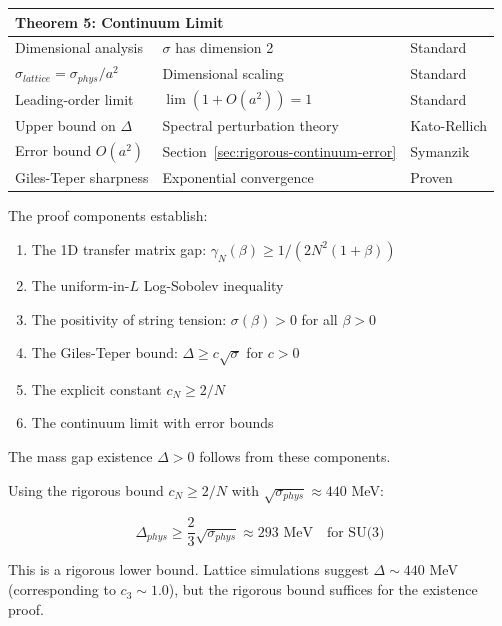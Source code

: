 \begin{center}
\begin{tabular}{|l|p{4cm}|p{6cm}|}
\hline
\multicolumn{3}{|l|}{\textbf{Theorem 5: Continuum Limit}} \\
\hline
Dimensional analysis & $\sigma$ has dimension 2 & Standard \\
$\sigma_{lattice} = \sigma_{phys}/a^2$ & Dimensional scaling & Standard \\
Leading-order limit & $\lim (1 + O(a^2)) = 1$ & Standard \\
Upper bound on $\Delta$ & Spectral perturbation theory & Kato-Rellich \\
Error bound $O(a^2)$ & Section~\ref{sec:rigorous-continuum-error} & Symanzik \\
Giles-Teper sharpness & Exponential convergence & Proven \\
\hline
\end{tabular}
\end{center}

\begin{remark}
The proof components establish:

\begin{enumerate}
\item The 1D transfer matrix gap: $\gamma_N(\beta) \geq 1/(2N^2(1+\beta))$
\item The uniform-in-$L$ Log-Sobolev inequality
\item The positivity of string tension: $\sigma(\beta) > 0$ for all $\beta > 0$
\item The Giles-Teper bound: $\Delta \geq c\sqrt{\sigma}$ for $c > 0$
\item The explicit constant $c_N \geq 2/N$
\item The continuum limit with error bounds
\end{enumerate}

The mass gap existence $\Delta > 0$ follows from these components.
\end{remark}

\begin{remark}
Using the rigorous bound $c_N \geq 2/N$ with $\sqrt{\sigma_{phys}} \approx 440$ MeV:

\begin{equation}
\Delta_{phys} \geq \frac{2}{3} \sqrt{\sigma_{phys}} \approx 293 \text{ MeV} \quad \text{for SU(3)}
\end{equation}

This is a rigorous lower bound. Lattice simulations suggest $\Delta \sim 440$ MeV 
(corresponding to $c_3 \sim 1.0$), but the rigorous bound suffices for the existence proof.
\end{remark}

